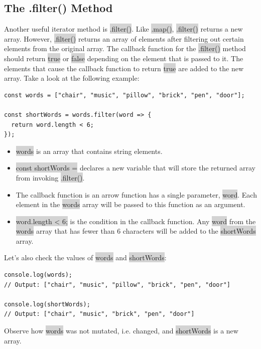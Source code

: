 \documentclass[11pt]{article}
\begin{document}
\subsection{The .filter() Method}
Another useful iterator method is \colorbox{lightgray}{.filter()}. Like \colorbox{lightgray}{.map()}, \colorbox{lightgray}{.filter()} returns a new array. However, \colorbox{lightgray}{.filter()} returns an array of elements after filtering out certain elements from the original array. The callback function for the \colorbox{lightgray}{.filter()} method should return \colorbox{lightgray}{true} or \colorbox{lightgray}{false} depending on the element that is passed to it. The elements that cause the callback function to return \colorbox{lightgray}{true} are added to the new array. Take a look at the following example:
\begin{lstlisting}
const words = ["chair", "music", "pillow", "brick", "pen", "door"]; 

const shortWords = words.filter(word => {
  return word.length < 6;
});
\end{lstlisting}
\begin{itemize}[leftmargin = *]
\item \colorbox{lightgray}{words} is an array that contains string elements.
\item \colorbox{lightgray}{const shortWords =} declares a new variable that will store the returned array from invoking \colorbox{lightgray}{.filter()}.
\item The callback function is an arrow function has a single parameter, \colorbox{lightgray}{word}. Each element in the \colorbox{lightgray}{words} array will be passed to this function as an argument.
\item \colorbox{lightgray}{word.length < 6;} is the condition in the callback function. Any \colorbox{lightgray}{word} from the \colorbox{lightgray}{words} array that has fewer than 6 characters will be added to the \colorbox{lightgray}{shortWords} array.
\end{itemize}
Let’s also check the values of \colorbox{lightgray}{words} and \colorbox{lightgray}{shortWords}:
\begin{lstlisting}
console.log(words); 
// Output: ["chair", "music", "pillow", "brick", "pen", "door"]

console.log(shortWords); 
// Output: ["chair", "music", "brick", "pen", "door"]
\end{lstlisting}
Observe how \colorbox{lightgray}{words} was not mutated, i.e. changed, and \colorbox{lightgray}{shortWords} is a new array.
\end{document}
